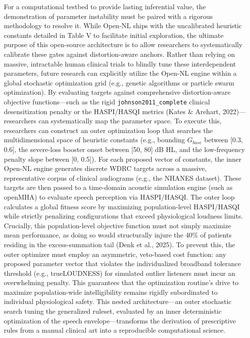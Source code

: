 \documentclass[
  12pt,
]{article}
\begin{document}
For a computational testbed to provide lasting inferential value, the
demonstration of parameter instability must be paired with a rigorous
methodology to resolve it. While Open-NL ships with the uncalibrated
heuristic constants detailed in Table V to facilitate initial
exploration, the ultimate purpose of this open-source architecture is to
allow researchers to systematically calibrate these gates against
distortion-aware anchors. Rather than relying on massive, intractable
human clinical trials to blindly tune these interdependent parameters,
future research can explicitly utilize the Open-NL engine within a
global stochastic optimization grid (e.g., genetic algorithms or
particle swarm optimization). By evaluating targets against
comprehensive distortion-aware objective functions---such as the rigid
\texttt{johnson2011\_complete} clinical desensitization penalty or the
HASPI/HASQI metrics (Kates \& Arehart, 2022)---researchers can
systematically map the parameter space. To execute this, researchers can
construct an outer optimization loop that searches the multidimensional
space of heuristic constants (e.g., bounding \(G_{base}\) between
{[}0.3, 0.6{]}, the severe-loss booster onset between {[}50, 80{]} dB
HL, and the low-frequency penalty slope between {[}0, 0.5{]}). For each
proposed vector of constants, the inner Open-NL engine generates
discrete WDRC targets across a massive, representative corpus of
clinical audiograms (e.g., the NHANES dataset). These targets are then
passed to a time-domain acoustic simulation engine (such as openMHA) to
evaluate speech perception via HASPI/HASQI. The outer loop calculates a
global fitness score by maximizing population-level HASPI/HASQI while
strictly penalizing configurations that exceed physiological loudness
limits. Crucially, this population-level objective function must not
simply maximize mean performance, as doing so would structurally injure
the 40\% of patients residing in the excess-summation tail (Denk et al.,
2025). To prevent this, the outer optimizer must employ an asymmetric,
veto-based cost function: any proposed parameter vector that violates
the individualized broadband tolerance threshold (e.g., trueLOUDNESS)
for simulated outlier listeners must incur an overwhelming penalty. This
guarantees that the optimization routine's drive to maximize
population-wide intelligibility remains rigidly subordinated to
individual physiological safety. This nested architecture---an outer
stochastic search tuning the generalized ruleset, evaluated by an inner
deterministic optimization of the speech envelope---transforms the
derivation of prescriptive rules from a manual clinical art into a
reproducible computational science.
\end{document}
